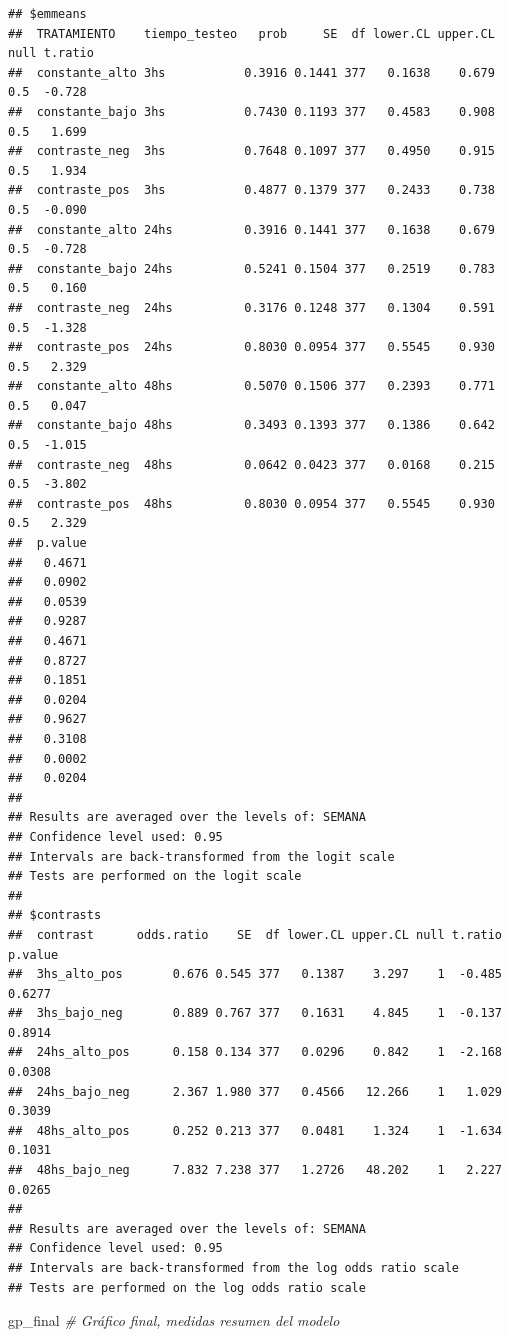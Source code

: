 \documentclass[]{article}
\newenvironment{Shaded}{\begin{snugshade}}{\end{snugshade}}
\newcommand{\CommentTok}[1]{\textcolor[rgb]{0.56,0.35,0.01}{\textit{#1}}}
\newcommand{\NormalTok}[1]{#1}
\begin{document}
\begin{verbatim}
## $emmeans
##  TRATAMIENTO    tiempo_testeo   prob     SE  df lower.CL upper.CL null t.ratio
##  constante_alto 3hs           0.3916 0.1441 377   0.1638    0.679  0.5  -0.728
##  constante_bajo 3hs           0.7430 0.1193 377   0.4583    0.908  0.5   1.699
##  contraste_neg  3hs           0.7648 0.1097 377   0.4950    0.915  0.5   1.934
##  contraste_pos  3hs           0.4877 0.1379 377   0.2433    0.738  0.5  -0.090
##  constante_alto 24hs          0.3916 0.1441 377   0.1638    0.679  0.5  -0.728
##  constante_bajo 24hs          0.5241 0.1504 377   0.2519    0.783  0.5   0.160
##  contraste_neg  24hs          0.3176 0.1248 377   0.1304    0.591  0.5  -1.328
##  contraste_pos  24hs          0.8030 0.0954 377   0.5545    0.930  0.5   2.329
##  constante_alto 48hs          0.5070 0.1506 377   0.2393    0.771  0.5   0.047
##  constante_bajo 48hs          0.3493 0.1393 377   0.1386    0.642  0.5  -1.015
##  contraste_neg  48hs          0.0642 0.0423 377   0.0168    0.215  0.5  -3.802
##  contraste_pos  48hs          0.8030 0.0954 377   0.5545    0.930  0.5   2.329
##  p.value
##   0.4671
##   0.0902
##   0.0539
##   0.9287
##   0.4671
##   0.8727
##   0.1851
##   0.0204
##   0.9627
##   0.3108
##   0.0002
##   0.0204
## 
## Results are averaged over the levels of: SEMANA 
## Confidence level used: 0.95 
## Intervals are back-transformed from the logit scale 
## Tests are performed on the logit scale 
## 
## $contrasts
##  contrast      odds.ratio    SE  df lower.CL upper.CL null t.ratio p.value
##  3hs_alto_pos       0.676 0.545 377   0.1387    3.297    1  -0.485  0.6277
##  3hs_bajo_neg       0.889 0.767 377   0.1631    4.845    1  -0.137  0.8914
##  24hs_alto_pos      0.158 0.134 377   0.0296    0.842    1  -2.168  0.0308
##  24hs_bajo_neg      2.367 1.980 377   0.4566   12.266    1   1.029  0.3039
##  48hs_alto_pos      0.252 0.213 377   0.0481    1.324    1  -1.634  0.1031
##  48hs_bajo_neg      7.832 7.238 377   1.2726   48.202    1   2.227  0.0265
## 
## Results are averaged over the levels of: SEMANA 
## Confidence level used: 0.95 
## Intervals are back-transformed from the log odds ratio scale 
## Tests are performed on the log odds ratio scale
\end{verbatim}

\begin{Shaded}
\begin{Highlighting}[]
\NormalTok{gp_final  }\CommentTok{# Gráfico final, medidas resumen del modelo}
\end{Highlighting}
\end{Shaded}
\end{document}
